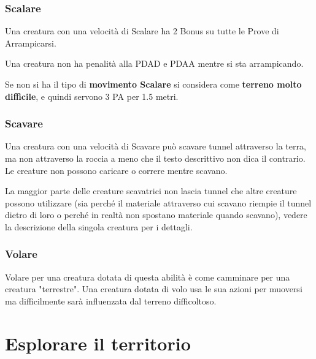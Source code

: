 \documentclass[12pt,a4paper,twoside,openany]{book}
\begin{document}
\begin{multicols}{2}
\subsubsection{Scalare}\label{scalare}

Una creatura con una velocità di Scalare ha 2 Bonus su tutte le Prove di Arrampicarsi. 

Una creatura non ha penalità alla PDAD e PDAA mentre si sta arrampicando.

Se non si ha il tipo di \textbf{movimento Scalare} si considera come \textbf{terreno molto difficile}, e quindi servono 3 PA per 1.5 metri.

\subsubsection{Scavare}\label{scavare}

Una creatura con una velocità di Scavare può scavare tunnel attraverso la terra, ma non attraverso la roccia a meno che il testo descrittivo non dica il contrario. Le creature non possono caricare o correre mentre scavano.

La maggior parte delle creature scavatrici non lascia tunnel che altre creature possono utilizzare (sia perché il materiale attraverso cui scavano riempie il tunnel dietro di loro o perché in realtà non spostano materiale quando scavano), vedere la descrizione della singola creatura per i dettagli.

\subsubsection{Volare}\label{volare}

Volare per una creatura dotata di questa abilità è come camminare per una creatura "terrestre". Una creatura dotata di volo usa le sua azioni per muoversi ma difficilmente sarà influenzata dal terreno difficoltoso.

\end{multicols}

\pagebreak

\section{Esplorare il territorio}\label{movimentoviaterra}
\end{document}
